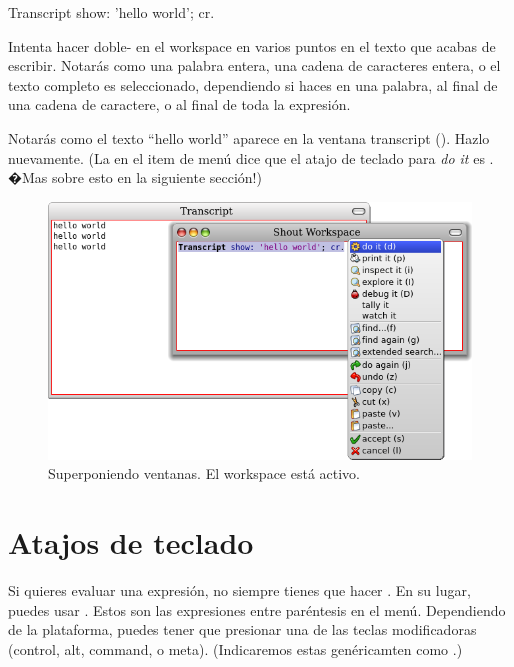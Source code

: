 \documentclass[a4paper,10pt,twoside]{book}
\begin{document}
\begin{code}{}
Transcript show: 'hello world'; cr.
\end{code}

Intenta hacer doble- en el workspace en varios puntos en el texto que acabas de escribir.
Notar\'as como una palabra entera, una cadena de caracteres entera, o el texto completo es seleccionado, dependiendo si haces \click en una palabra, al final de una cadena de caractere, o al final de toda la expresi\'on.

Notar\'as como el texto ``hello world'' aparece en la ventana transcript
().
Hazlo nuevamente.
(La  en el item de men\'u  dice que el atajo de teclado para \emph{do it} es . �Mas sobre esto en la siguiente secci\'on!)

\begin{figure}[htb]
\centerline {\includegraphics[width=\textwidth]{HelloWorld}}
\caption{Superponiendo ventanas. El workspace est\'a activo.}
\end{figure}

\section{Atajos de teclado}

Si quieres evaluar una expresi\'on, no siempre tienes que hacer \actclick. En su lugar, puedes usar . Estos son las expresiones entre par\'entesis en el men\'u. Dependiendo de la plataforma, puedes tener que presionar una de las teclas modificadoras (control, alt, command, o meta).
(Indicaremos estas gen\'ericamten como .)
\end{document}
